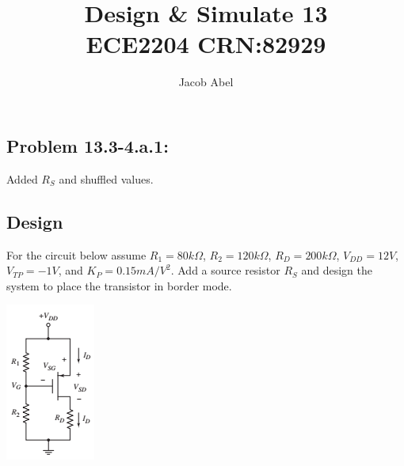 \documentclass[12pt,letterpaper,titlepage]{article}
\author{Jacob Abel}
\title{	Design \& Simulate 13
	\\\large ECE2204 CRN:82929
}
\begin{document}
\maketitle
\begin{raggedright}

\section{Problem 13.3-4.a.1: } Added $R_S$ and shuffled values.
\subsection{Design}

For the circuit below assume $R_1 = 80k\Omega$, $R_2 = 120k\Omega$, $R_D = 200k\Omega$, $V_{DD} = 12V$, $V_{TP} = -1V$, and $K_P = 0.15 mA/V^2$. Add a source resistor $R_S$ and design the system to place the transistor in border mode.

\begin{center}
\includegraphics[width=\textwidth, height=12\baselineskip, keepaspectratio=true]{ds1}
\end{center}


\end{raggedright}
\end{document}
